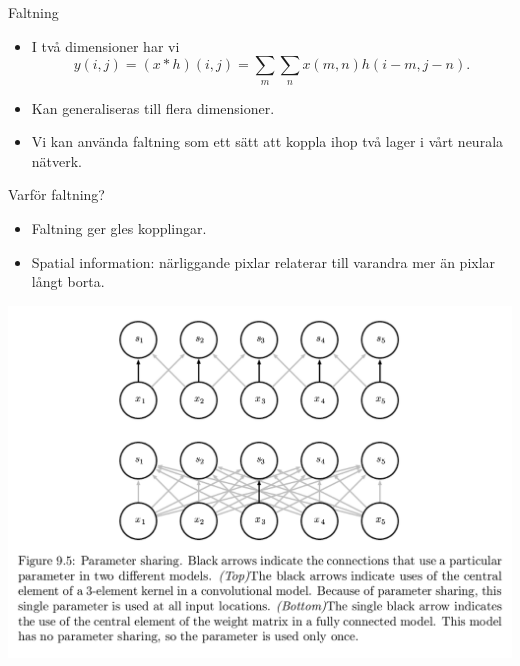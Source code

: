 \documentclass[10pt,english]{beamer}
\begin{document}
\begin{frame}{Faltning}

    \begin{itemize}
        \item I två dimensioner har vi
        \begin{equation*}
            y(i,j) = (x * h)(i,j) = \sum_m \sum_n x(m,n) h(i-m,j-n).
        \end{equation*}
        \item Kan generaliseras till flera dimensioner.
        \item Vi kan använda faltning som ett sätt att koppla ihop två lager i vårt neurala nätverk.
    \end{itemize}
    
\end{frame}

\begin{frame}{Varför faltning?}

    \begin{itemize}
        \item Faltning ger gles kopplingar.
        \item Spatial information: närliggande pixlar relaterar till varandra mer än pixlar långt borta.
    \end{itemize}

    \includegraphics[width=.9\textwidth]{figs/CNN_sparse_con.png}
    
\end{frame}
\end{document}
